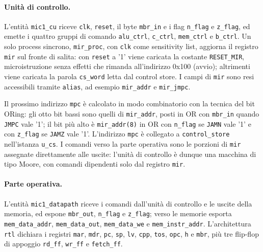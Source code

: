 
\paragraph{Unità di controllo.}
L'entità \texttt{mic1\_cu} riceve \texttt{clk}, \texttt{reset}, il byte \texttt{mbr\_in} e i flag \texttt{n\_flag} e \texttt{z\_flag}, ed emette i quattro gruppi di comando \texttt{alu\_ctrl}, \texttt{c\_ctrl}, \texttt{mem\_ctrl} e \texttt{b\_ctrl}. Un solo process sincrono, \texttt{mir\_proc}, con \texttt{clk} come sensitivity list, aggiorna il registro \texttt{mir} sul fronte di salita: con \texttt{reset} a '1' viene caricata la costante \texttt{RESET\_MIR}, microistruzione senza effetti che rimanda all'indirizzo 0x100 (avvio); altrimenti viene caricata la parola \texttt{cs\_word} letta dal control store. I campi di \texttt{mir} sono resi accessibili tramite \texttt{alias}, ad esempio \texttt{mir\_addr} e \texttt{mir\_jmpc}.

Il prossimo indirizzo \texttt{mpc} è calcolato in modo combinatorio con la tecnica del bit ORing: gli otto bit bassi sono quelli di \texttt{mir\_addr}, posti in OR con \texttt{mbr\_in} quando \texttt{JMPC} vale '1'; il bit più alto è \texttt{mir\_addr(8)} in OR con \texttt{n\_flag} se \texttt{JAMN} vale '1' e con \texttt{z\_flag} se \texttt{JAMZ} vale '1'. L'indirizzo \texttt{mpc} è collegato a \texttt{control\_store} nell'istanza \texttt{u\_cs}. I comandi verso la parte operativa sono le porzioni di \texttt{mir} assegnate direttamente alle uscite: l'unità di controllo è dunque una macchina di tipo Moore, con comandi dipendenti solo dal registro \texttt{mir}.


\paragraph{Parte operativa.}
L'entità \texttt{mic1\_datapath} riceve i comandi dall'unità di controllo e le uscite della memoria, ed espone \texttt{mbr\_out}, \texttt{n\_flag} e \texttt{z\_flag}; verso le memorie esporta \texttt{mem\_data\_addr}, \texttt{mem\_data\_out}, \texttt{mem\_data\_we} e \texttt{mem\_instr\_addr}. L'architettura \texttt{rtl} dichiara i registri \texttt{mar}, \texttt{mdr}, \texttt{pc}, \texttt{sp}, \texttt{lv}, \texttt{cpp}, \texttt{tos}, \texttt{opc}, \texttt{h} e \texttt{mbr}, più tre flip-flop di appoggio \texttt{rd\_ff}, \texttt{wr\_ff} e \texttt{fetch\_ff}.

